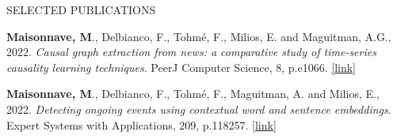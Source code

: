 \documentclass{resume} %
\begin{document}
\begin{rSection}{SELECTED PUBLICATIONS}
\vspace{-1.25em}
\item \textbf{Maisonnave, M}., Delbianco, F., Tohmé, F., Milios, E. and Maguitman, A.G., 2022. \textit{Causal graph extraction from news: a comparative study of time-series causality learning techniques}. PeerJ Computer Science, 8, p.e1066. \href{https://peerj.com/articles/cs-1066/}{[link]}
\vspace{-0.3cm}
\item \textbf{Maisonnave, M}., Delbianco, F., Tohmé, F., Maguitman, A. and Milios, E., 2022. \textit{Detecting ongoing events using contextual word and sentence embeddings}. Expert Systems with Applications, 209, p.118257. \href{https://www.sciencedirect.com/science/article/pii/S0957417422013975}{[link]}
\vspace{-0.2cm}
\end{rSection} 

\end{document}
